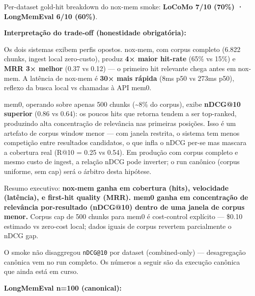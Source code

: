 \documentclass[
]{article}
\begin{document}
Per-dataset gold-hit breakdown do nox-mem smoke: \textbf{LoCoMo 7/10
(70\%) · LongMemEval 6/10 (60\%)}.

\textbf{Interpretação do trade-off (honestidade obrigatória):}

Os dois sistemas exibem perfis opostos. nox-mem, com corpus completo
(6.822 chunks, ingest local zero-custo), produz \textbf{4× maior
hit-rate} (65\% vs 15\%) e \textbf{MRR 3× melhor} (0.37 vs 0.12) --- o
primeiro hit relevante chega antes em nox-mem. A latência de nox-mem é
\textbf{30× mais rápida} (8ms p50 vs 273ms p50), reflexo da busca local
vs chamadas à API mem0.

mem0, operando sobre apenas 500 chunks (\textasciitilde8\% do corpus),
exibe \textbf{nDCG@10 superior} (0.86 vs 0.64): os poucos hits que
retorna tendem a ser top-ranked, produzindo alta concentração de
relevância nas primeiras posições. Isso é um artefato de corpus window
menor --- com janela restrita, o sistema tem menos competição entre
resultados candidatos, o que infla o nDCG per-se mas mascara a cobertura
real (R@10 = 0.25 vs 0.54). Em produção com corpus completo e mesmo
custo de ingest, a relação nDCG pode inverter; o run canônico (corpus
uniforme, sem cap) será o árbitro desta hipótese.

Resumo executivo: \textbf{nox-mem ganha em cobertura (hits), velocidade
(latência), e first-hit quality (MRR). mem0 ganha em concentração de
relevância por-resultado (nDCG@10) dentro de uma janela de corpus
menor.} Corpus cap de 500 chunks para mem0 é cost-control explícito ---
\$0.10 estimado vs zero-cost local; dados iguais de corpus revertem
parcialmente o nDCG gap.

O smoke não disaggregou \texttt{nDCG@10} por dataset (combined-only) ---
desagregação canônica vem no run completo. Os números a seguir são da
execução canônica que ainda está em curso.

\textbf{LongMemEval n=100 (canonical):}
\end{document}
